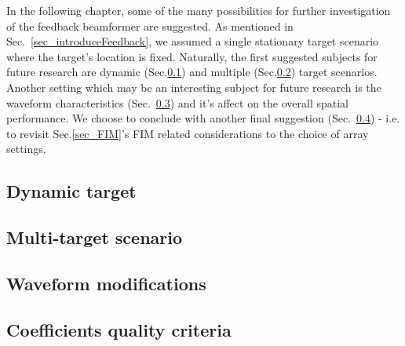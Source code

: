 In the following chapter, some of the many possibilities for further investigation of the feedback beamformer are suggested.
As mentioned in Sec.~\ref{sec_introduceFeedback}, we assumed a single stationary target scenario where the target's location is fixed.
Naturally, the first suggested subjects for future research are dynamic (Sec.\ref{sec_future_dynamic}) and multiple (Sec.\ref{sec_future_multiTarget}) target scenarios.
Another setting which may be an interesting subject for future research is the waveform characteristics (Sec.~\ref{sec_future_wavfrom}) and it's affect on the overall spatial performance.
We choose to conclude with another final suggestion (Sec.~\ref{sec_future_coef}) - i.e. to revisit Sec.\ref{sec_FIM}'s FIM related considerations to the choice of array settings. 
\subsection{Dynamic target}
\label{sec_future_dynamic}

\subsection{Multi-target scenario}
\label{sec_future_multiTarget}

\subsection{Waveform modifications}
\label{sec_future_wavfrom}

\subsection{Coefficients quality criteria}
\label{sec_future_coef}

% 